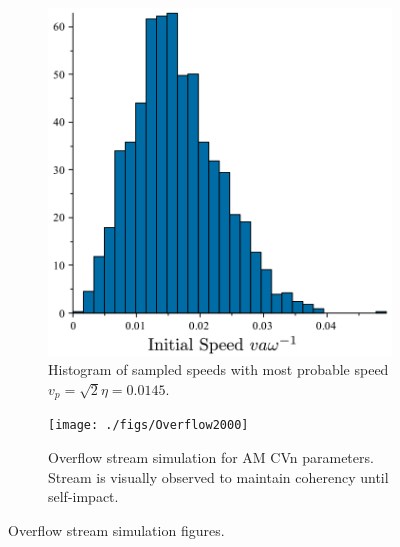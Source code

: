 \documentclass[preprint2]{aastex}
\begin{document}
\begin{figure}
        \centering
        \begin{subfigure}[b]{0.45\textwidth}
	        \centering
                \includegraphics[width=\textwidth]{./figs/speed_hist}
                \caption{Histogram of sampled speeds with most probable speed $v_{p} = \sqrt{2}\eta = 0.0145$.}
                \label{fig.streamHist}
        \end{subfigure}%
        \quad %
        \begin{subfigure}[b]{0.45\textwidth}
        			\centering
                \texttt{[image: ./figs/Overflow2000]}
                \caption{Overflow stream simulation for AM CVn parameters.  Stream
  is visually observed to maintain coherency until self-impact.}
                \label{fig.coherentStream}
        \end{subfigure}
        \caption{Overflow stream simulation figures.}
        \label{fig.streamSim}
\end{figure}

\end{document}
